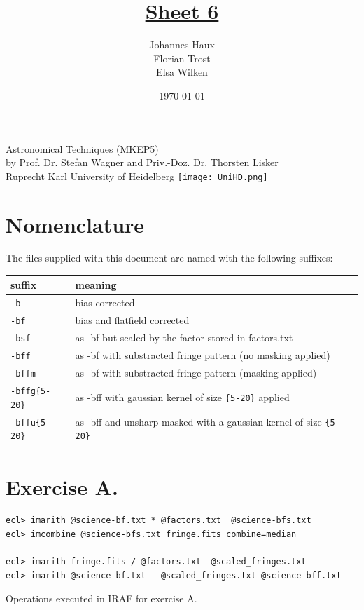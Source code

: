 \documentclass[11pt,a4paper,twoside]{article}
\title{\LARGE \underline {Sheet 6}}
\author{Johannes Haux \\ Florian Trost \\ Elsa Wilken}
\date{\today}
\begin{document}
\maketitle
\thispagestyle{empty}

\begin{center}
  Astronomical Techniques (MKEP5) \\
  \baselineskip35pt
  by Prof. Dr. Stefan Wagner and Priv.-Doz. Dr. Thorsten Lisker \\
  \baselineskip60pt
  Ruprecht Karl University of Heidelberg
\vskip 40pt
\texttt{[image: UniHD.png]}

\end{center}

\newpage
\setcounter{page}{1}		%

\section*{Nomenclature}
The files supplied with this document are named with the following suffixes:
\begin{table}[h!]
\begin{tabular}{ll}\toprule
suffix          & meaning \\ \midrule
\verb+-b+       & bias corrected \\
\verb+-bf+      & bias and flatfield corrected	\\
\verb+-bsf+     & as -bf but scaled by the factor stored in factors.txt	\\
\verb+-bff+     & as -bf with substracted fringe pattern (no masking applied)	\\
\verb+-bffm+    & as -bf with substracted fringe pattern (masking applied)	\\
\verb+-bffg{5-20}+    & as -bff with gaussian kernel of size \verb+{5-20}+ applied	\\
\verb+-bffu{5-20}+    & as -bff and unsharp masked with a gaussian kernel of size \verb+{5-20}+	\\
\bottomrule
\end{tabular}
\end{table}


\section*{Exercise A.}

\begin{listing}[h!]
\begin{verbatim}
ecl> imarith @science-bf.txt * @factors.txt  @science-bfs.txt
ecl> imcombine @science-bfs.txt fringe.fits combine=median

ecl> imarith fringe.fits / @factors.txt  @scaled_fringes.txt
ecl> imarith @science-bf.txt - @scaled_fringes.txt @science-bff.txt
\end{verbatim}
\caption{Operations executed in IRAF for exercise A.}
\label{fig:ca}
\end{listing}
\end{document}
